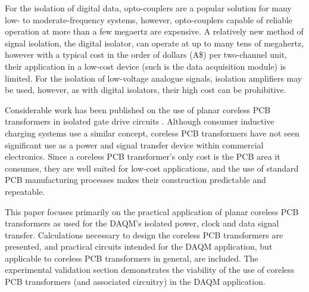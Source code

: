 \documentclass[conference]{IEEEtran}
\begin{document}
For the isolation of digital data, opto-couplers are a popular solution for many low- to moderate-frequency systems, however, opto-couplers capable of reliable operation at more than a few megaertz are expensive.  A relatively new method of signal isolation, the digital isolator, can operate at up to many tens of megahertz, however with a typical cost in the order of dollars (A\$) per two-channel unit, their application in a low-cost device (such is the data acquisition module) is limited.  For the isolation of low-voltage analogue signals, isolation amplifiers may be used, however, as with digital isolators, their high cost can be prohibitive.

Considerable work has been published on the use of planar coreless PCB transformers in isolated gate drive circuits \cite{TangHuiFundamental,NaturallySoft,OptimalOperation,CorelessGateDrive}.  Although consumer inductive charging systems use a similar concept, coreless PCB transformers have not seen significant use as a power and signal transfer device within commercial electronics.  Since a coreless PCB transformer's only cost is the PCB area it consumes, they are well suited for low-cost applications, and the use of standard PCB manufacturing processes makes their construction predictable and repeatable.

This paper focuses primarily on the practical application of planar coreless PCB transformers as used for the DAQM's isolated power, clock and data signal transfer.  Calculations necessary to design the coreless PCB transformers are presented, and practical circuits intended for the DAQM application, but applicable to coreless PCB transformers in general, are included.  The experimental validation section demonstrates the viability of the use of coreless PCB transformers (and associated circuitry) in the DAQM application.
\end{document}
